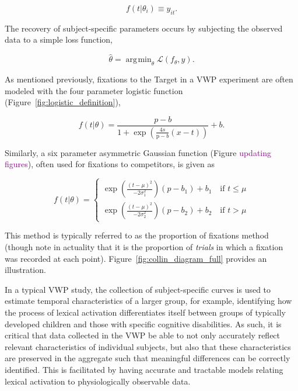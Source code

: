 \documentclass{article}
\providecommand{\cmt}[1]{\textcolor{purple}{#1}}
\DeclareMathOperator*{\argmin}{arg\!\min}
\begin{document}
\begin{equation}\label{eq:empir_to_activation}
f(t | \theta_i) \equiv y_{it}.
\end{equation}

The recovery of subject-specific parameters occurs by subjecting the observed data to a simple loss function, 

\begin{equation}\label{eq:prop_loss}
\hat{\theta} = \argmin_{\theta} \mathcal{L}(f_{\theta}, y).
\end{equation}

As mentioned previously, fixations to the Target in a VWP experiment are often modeled with the four parameter logistic function (Figure~\ref{fig:logistic_definition}), 

\begin{equation} \label{eq:logistic}
f(t|\theta) = \frac{p-b}{1 + \exp \left(\frac{4s}{\text{p}-b} (x - t) \right)} + b.
\end{equation}

Similarly, a six parameter asymmetric Gaussian function (Figure \cmt{updating figures}), often used for fixations to competitors, is given as

\begin{equation} \label{eq:dg2}
f(t|\theta) = \begin{cases}
\exp \left( \frac{(t - \mu)^2}{-2\sigma_1^2} \right) (p - b_1) + b_1 \quad \text{if } t \leq \mu \\
\exp \left( \frac{(t - \mu)^2}{-2\sigma_2^2} \right) (p - b_2) + b_2 \quad \text{if } t > \mu
\end{cases}
\end{equation}

This method is typically referred to as the proportion of fixations method (though note in actuality that it is the proportion of \emph{trials} in which a fixation was recorded at each point). Figure~\ref{fig:collin_diagram_full} provides an illustration.

In a typical VWP study, the collection of subject-specific curves is used to estimate temporal characteristics of a larger group, for example, identifying how the process of lexical activation differentiates itself between groups of typically developed children and those with specific cognitive disabilities. As such, it is critical that data collected in the VWP be able to not only accurately reflect relevant characteristics of individual subjects, but also that these characteristics are preserved in the aggregate such that meaningful differences can be correctly identified. This is facilitated by having accurate and tractable models relating lexical activation to physiologically observable data. 
\end{document}
